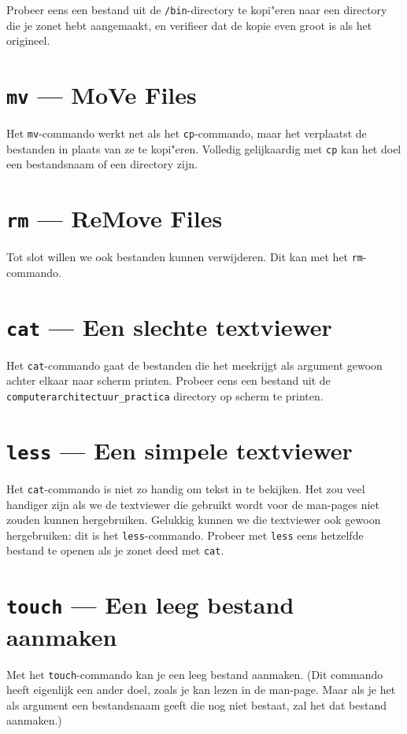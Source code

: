\documentclass[a4paper,twoside,openany]{memoir}
\begin{document}
Probeer eens een bestand uit de \verb!/bin!-directory te kopi"eren naar een directory die je zonet hebt aangemaakt, en verifieer dat de kopie even groot is als het origineel.

\section{\texttt{mv} --- MoVe Files}

Het \verb!mv!-commando werkt net als het \verb!cp!-commando, maar het verplaatst de bestanden in plaats van ze te kopi"eren. Volledig gelijkaardig met \verb!cp! kan het doel een bestandsnaam of een directory zijn.

\section{\texttt{rm} --- ReMove Files}

Tot slot willen we ook bestanden kunnen verwijderen. Dit kan met het \verb!rm!-commando.

\section{\texttt{cat} --- Een slechte textviewer}
Het \verb!cat!-commando gaat de bestanden die het meekrijgt als argument gewoon achter elkaar naar scherm printen. Probeer eens een bestand uit de \verb!computerarchitectuur_practica! directory op scherm te printen.

\section{\texttt{less} --- Een simpele textviewer}
Het \verb!cat!-commando is niet zo handig om tekst in te bekijken. Het zou veel handiger zijn als we de textviewer die gebruikt wordt voor de man-pages niet zouden kunnen hergebruiken. Gelukkig kunnen we die textviewer ook gewoon hergebruiken: dit is het \verb!less!-commando. Probeer met \verb!less! eens hetzelfde bestand te openen als je zonet deed met \verb!cat!.

\section{\texttt{touch} --- Een leeg bestand aanmaken}

Met het \verb!touch!-commando kan je een leeg bestand aanmaken. (Dit commando heeft eigenlijk een ander doel, zoals je kan lezen in de man-page. Maar als je het als argument een bestandsnaam geeft die nog niet bestaat, zal het dat bestand aanmaken.)
\end{document}
